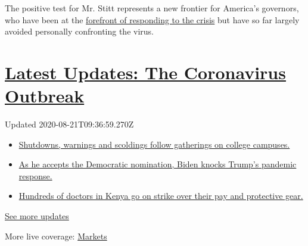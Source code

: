 The positive test for Mr. Stitt represents a new frontier for America's
governors, who have been at the
\href{https://www.nytimes3xbfgragh.onion/2020/07/13/us/coronavirus-governors.html}{forefront
of responding to the crisis} but have so far largely avoided personally
confronting the virus.

\hypertarget{latest-updates-the-coronavirus-outbreak}{%
\section{\texorpdfstring{\href{https://www.nytimes3xbfgragh.onion/2020/08/21/world/covid-19-coronavirus.html?action=click\&pgtype=Article\&state=default\&region=MAIN_CONTENT_1\&context=storylines_live_updates}{Latest
Updates: The Coronavirus
Outbreak}}{Latest Updates: The Coronavirus Outbreak}}\label{latest-updates-the-coronavirus-outbreak}}

Updated 2020-08-21T09:36:59.270Z

\begin{itemize}
\tightlist
\item
  \href{https://www.nytimes3xbfgragh.onion/2020/08/21/world/covid-19-coronavirus.html?action=click\&pgtype=Article\&state=default\&region=MAIN_CONTENT_1\&context=storylines_live_updates\#link-4690b6aa}{Shutdowns,
  warnings and scoldings follow gatherings on college campuses.}
\item
  \href{https://www.nytimes3xbfgragh.onion/2020/08/21/world/covid-19-coronavirus.html?action=click\&pgtype=Article\&state=default\&region=MAIN_CONTENT_1\&context=storylines_live_updates\#link-324af071}{As
  he accepts the Democratic nomination, Biden knocks Trump's pandemic
  response.}
\item
  \href{https://www.nytimes3xbfgragh.onion/2020/08/21/world/covid-19-coronavirus.html?action=click\&pgtype=Article\&state=default\&region=MAIN_CONTENT_1\&context=storylines_live_updates\#link-35890b73}{Hundreds
  of doctors in Kenya go on strike over their pay and protective gear.}
\end{itemize}

\href{https://www.nytimes3xbfgragh.onion/2020/08/21/world/covid-19-coronavirus.html?action=click\&pgtype=Article\&state=default\&region=MAIN_CONTENT_1\&context=storylines_live_updates}{See
more updates}

More live coverage:
\href{https://www.nytimes3xbfgragh.onion/live/2020/08/20/business/stock-market-today-coronavirus?action=click\&pgtype=Article\&state=default\&region=MAIN_CONTENT_1\&context=storylines_live_updates}{Markets}

